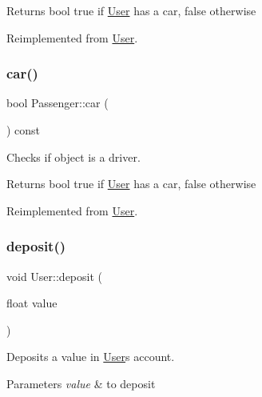 \begin{DoxyReturn}{Returns}
bool true if \hyperlink{class_user}{User} has a car, false otherwise 
\end{DoxyReturn}


Reimplemented from \hyperlink{group___user_ga86635e817828c81ee5e18b2e802e3218}{User}.

\mbox{\label{group___user_gaeb69b29d53079577e41f070da1f442dd}} 
\subsubsection{\texorpdfstring{car()}{car()}\hspace{0.1cm}{\footnotesize\ttfamily [3/3]}}
{\footnotesize\ttfamily bool Passenger\+::car (\begin{DoxyParamCaption}{ }\end{DoxyParamCaption}) const\hspace{0.3cm}{\ttfamily [virtual]}}



Checks if object is a driver. 

\begin{DoxyReturn}{Returns}
bool true if \hyperlink{class_user}{User} has a car, false otherwise 
\end{DoxyReturn}


Reimplemented from \hyperlink{group___user_ga86635e817828c81ee5e18b2e802e3218}{User}.

\mbox{\label{group___user_gafe73f0b48d4aa29e9205f706a21b7068}} 
\subsubsection{\texorpdfstring{deposit()}{deposit()}}
{\footnotesize\ttfamily void User\+::deposit (\begin{DoxyParamCaption}\item[{float}]{value }\end{DoxyParamCaption})}



Deposits a value in \hyperlink{class_user}{User}\textquotesingle{}s account. 


\begin{DoxyParams}{Parameters}
{\em value} & to deposit \\
\hline
\end{DoxyParams}
\mbox{\label{group___user_ga781d40c6af9f399284149602ead32171}} 
